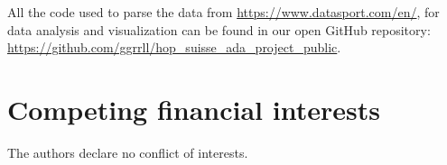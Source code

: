 \documentclass[fleqn,10pt]{wlscirep}
\begin{document}
All the code used to parse the data from \url{https://www.datasport.com/en/}, for data analysis and visualization can be found in our open GitHub repository: \url{https://github.com/ggrrll/hop_suisse_ada_project_public}.\\

\section*{Competing financial interests}

The authors declare no conflict of interests.



\newpage




%

%

\end{document}
